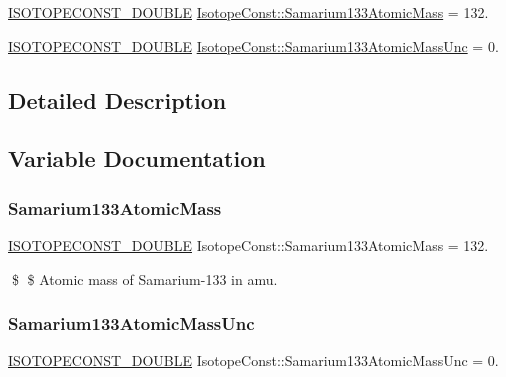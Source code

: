 \begin{DoxyCompactItemize}
\item 
\mbox{\hyperlink{group___isotope_const-_macros_ga8f45a7272ce02c0b4c65c44636ed719a}{I\+S\+O\+T\+O\+P\+E\+C\+O\+N\+S\+T\+\_\+\+D\+O\+U\+B\+LE}} \mbox{\hyperlink{group___isotope_const-_samarium-_sm133_gacbf9fd70e74f85f867890ab115b612c4}{Isotope\+Const\+::\+Samarium133\+Atomic\+Mass}} = 132.
\item 
\mbox{\hyperlink{group___isotope_const-_macros_ga8f45a7272ce02c0b4c65c44636ed719a}{I\+S\+O\+T\+O\+P\+E\+C\+O\+N\+S\+T\+\_\+\+D\+O\+U\+B\+LE}} \mbox{\hyperlink{group___isotope_const-_samarium-_sm133_gac40e3432fbf80d4bacdb4f9ca67f6437}{Isotope\+Const\+::\+Samarium133\+Atomic\+Mass\+Unc}} = 0.
\end{DoxyCompactItemize}


\subsection{Detailed Description}


\subsection{Variable Documentation}
\mbox{\label{group___isotope_const-_samarium-_sm133_gacbf9fd70e74f85f867890ab115b612c4}} 
\subsubsection{\texorpdfstring{Samarium133\+Atomic\+Mass}{Samarium133AtomicMass}}
{\footnotesize\ttfamily \mbox{\hyperlink{group___isotope_const-_macros_ga8f45a7272ce02c0b4c65c44636ed719a}{I\+S\+O\+T\+O\+P\+E\+C\+O\+N\+S\+T\+\_\+\+D\+O\+U\+B\+LE}} Isotope\+Const\+::\+Samarium133\+Atomic\+Mass = 132.}

\$ \$ Atomic mass of Samarium-\/133 in amu. \mbox{\label{group___isotope_const-_samarium-_sm133_gac40e3432fbf80d4bacdb4f9ca67f6437}} 
\subsubsection{\texorpdfstring{Samarium133\+Atomic\+Mass\+Unc}{Samarium133AtomicMassUnc}}
{\footnotesize\ttfamily \mbox{\hyperlink{group___isotope_const-_macros_ga8f45a7272ce02c0b4c65c44636ed719a}{I\+S\+O\+T\+O\+P\+E\+C\+O\+N\+S\+T\+\_\+\+D\+O\+U\+B\+LE}} Isotope\+Const\+::\+Samarium133\+Atomic\+Mass\+Unc = 0.}

